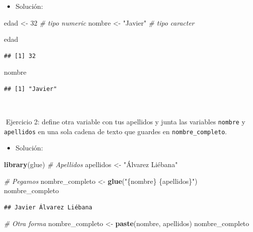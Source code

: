 \documentclass[11pt,]{book}
\newenvironment{Shaded}{\begin{snugshade}}{\end{snugshade}}
\newcommand{\CommentTok}[1]{\textcolor[rgb]{0.37,0.37,0.37}{\textit{#1}}}
\newcommand{\DecValTok}[1]{\textcolor[rgb]{0.06,0.06,0.06}{#1}}
\newcommand{\KeywordTok}[1]{\textcolor[rgb]{0.27,0.27,0.27}{\textbf{#1}}}
\newcommand{\NormalTok}[1]{#1}
\newcommand{\StringTok}[1]{\textcolor[rgb]{0.5,0.5,0.5}{#1}}
\providecommand{\tightlist}{%
  \setlength{\itemsep}{0pt}\setlength{\parskip}{0pt}}
\begin{document}
\begin{itemize}
\tightlist
\item
  Solución:
\end{itemize}

\begin{Shaded}
\begin{Highlighting}[]
\NormalTok{edad <-}\StringTok{ }\DecValTok{32} \CommentTok{# tipo numeric}
\NormalTok{nombre <-}\StringTok{ "Javier"} \CommentTok{# tipo caracter}

\NormalTok{edad}
\end{Highlighting}
\end{Shaded}

\begin{verbatim}
## [1] 32
\end{verbatim}

\begin{Shaded}
\begin{Highlighting}[]
\NormalTok{nombre}
\end{Highlighting}
\end{Shaded}

\begin{verbatim}
## [1] "Javier"
\end{verbatim}

~

📝Ejercicio 2: define otra variable con tus apellidos y junta las variables \texttt{nombre} y \texttt{apellidos} en una sola cadena de texto que guardes en \texttt{nombre\_completo}.

\begin{itemize}
\tightlist
\item
  Solución:
\end{itemize}

\begin{Shaded}
\begin{Highlighting}[]
\KeywordTok{library}\NormalTok{(glue)}
\CommentTok{# Apellidos}
\NormalTok{apellidos <-}\StringTok{ "Álvarez Liébana"}

\CommentTok{# Pegamos}
\NormalTok{nombre_completo <-}\StringTok{ }\KeywordTok{glue}\NormalTok{(}\StringTok{"\{nombre\} \{apellidos\}"}\NormalTok{)}
\NormalTok{nombre_completo}
\end{Highlighting}
\end{Shaded}

\begin{verbatim}
## Javier Álvarez Liébana
\end{verbatim}

\begin{Shaded}
\begin{Highlighting}[]
\CommentTok{# Otra forma}
\NormalTok{nombre_completo <-}\StringTok{ }\KeywordTok{paste}\NormalTok{(nombre, apellidos)}
\NormalTok{nombre_completo}
\end{Highlighting}
\end{Shaded}
\end{document}
